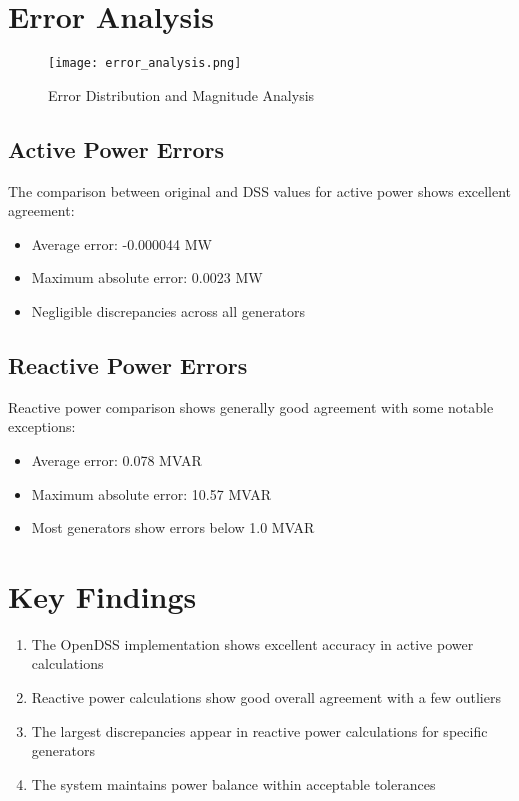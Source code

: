 \documentclass[11pt]{article}
\begin{document}
\section{Error Analysis}
\begin{figure}[H]
    \centering
    \texttt{[image: error\_analysis.png]}
    \caption{Error Distribution and Magnitude Analysis}
    \label{fig:error_analysis}
\end{figure}

\subsection{Active Power Errors}
The comparison between original and DSS values for active power shows excellent agreement:
\begin{itemize}
    \item Average error: -0.000044 MW
    \item Maximum absolute error: 0.0023 MW
    \item Negligible discrepancies across all generators
\end{itemize}

\subsection{Reactive Power Errors}
Reactive power comparison shows generally good agreement with some notable exceptions:
\begin{itemize}
    \item Average error: 0.078 MVAR
    \item Maximum absolute error: 10.57 MVAR
    \item Most generators show errors below 1.0 MVAR
\end{itemize}

\section{Key Findings}
\begin{enumerate}
    \item The OpenDSS implementation shows excellent accuracy in active power calculations
    \item Reactive power calculations show good overall agreement with a few outliers
    \item The largest discrepancies appear in reactive power calculations for specific generators
    \item The system maintains power balance within acceptable tolerances
\end{enumerate}
\end{document}
